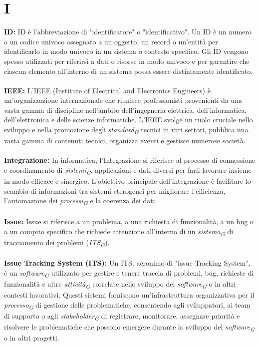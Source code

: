 \documentclass{article}
\begin{document}
\section*{I}
{}
\textbf{ID:} ID è l'abbreviazione di "identificatore" o "identificativo". Un ID è un numero o un codice univoco assegnato a un oggetto, un record o un'entità per identificarlo in modo univoco in un sistema o contesto specifico. Gli ID vengono spesso utilizzati per riferirsi a dati o risorse in modo univoco e per garantire che ciascun elemento all'interno di un sistema possa essere distintamente identificato.
\\
\\
\textbf{IEEE:} L'IEEE (Institute of Electrical and Electronics Engineers) è un'organizzazione internazionale che riunisce professionisti provenienti da una vasta gamma di discipline nell'ambito dell'ingegneria elettrica, dell'informatica, dell'elettronica e delle scienze informatiche. L'IEEE svolge un ruolo cruciale nello sviluppo e nella promozione degli \textit{standard}\textsubscript{\textit{G}} tecnici in vari settori, pubblica una vasta gamma di contenuti tecnici, organizza eventi e gestisce numerose società.
\\
\\
\textbf{Integrazione:} In informatica, l'Integrazione si riferisce al processo di connessione e coordinamento di \textit{sistemi}\textsubscript{\textit{G}}, applicazioni e dati diversi per farli lavorare insieme in modo efficace e sinergico. L'obiettivo principale dell'integrazione è facilitare lo scambio di informazioni tra sistemi eterogenei per migliorare l'efficienza, l'automazione dei \textit{processi}\textsubscript{\textit{G}} e la coerenza dei dati.
\\
\\
\textbf{Issue:} Issue si riferisce a un problema, a una richiesta di funzionalità, a un bug o a un compito specifico che richiede attenzione all'interno di un \textit{sistema}\textsubscript{\textit{G}} di tracciamento dei problemi (\textit{ITS}\textsubscript{\textit{G}}).
\\
\\
\textbf{Issue Tracking System (ITS):} Un ITS, acronimo di "Issue Tracking System", è un \textit{software}\textsubscript{\textit{G}} utilizzato per gestire e tenere traccia di problemi, bug, richieste di funzionalità e altre \textit{attività}\textsubscript{\textit{G}} correlate nello sviluppo del \textit{software}\textsubscript{\textit{G}} o in altri contesti lavorativi. Questi sistemi forniscono un'infrastruttura organizzativa per il \textit{processo}\textsubscript{\textit{G}} di gestione delle problematiche, consentendo agli sviluppatori, ai team di supporto o agli \textit{stakeholder}\textsubscript{\textit{G}} di registrare, monitorare, assegnare priorità e risolvere le problematiche che possono emergere durante lo sviluppo del \textit{software}\textsubscript{\textit{G}} o in altri progetti.
\pagebreak
\end{document}
